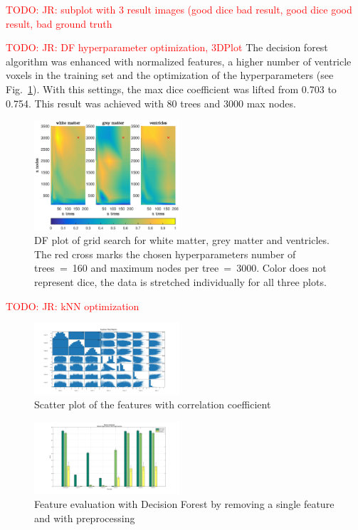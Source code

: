 \documentclass[journal]{IEEEtran}
\newcommand\TODO[1]{\textcolor{red}{TODO: #1}}
\begin{document}
\TODO{JR: subplot with 3 result images (good dice bad result, good dice good result, bad ground truth}



\TODO{JR: DF hyperparameter optimization, 3DPlot}
The decision forest algorithm was enhanced with normalized features, a higher number of ventricle voxels in the training set and the optimization of the hyperparameters (see Fig.~\ref{f.df_white}). With this settings, the max dice coefficient was lifted from 0.703 to 0.754. This result was achieved with 80 trees and 3000 max nodes.

\begin{figure}[h!]\label{f.df_white}
	\centering
	\includegraphics[width=0.48\textwidth]{images/df_grid}
	\caption{DF plot of grid search for white matter, grey matter and ventricles. The red cross marks the chosen hyperparameters number of trees~=~160 and maximum nodes per tree~=~3000. Color does not represent dice, the data is stretched individually for all three plots.}
\end{figure}

\TODO{JR: kNN optimization}

\begin{figure}\label{scatterplot}
	\centering
	\includegraphics[width=0.48\textwidth]{images/ScatterPlotMatrix}
	\caption{Scatter plot of the features with correlation coefficient}
\end{figure}

\begin{figure}\label{DF_FeatEval_WSF_PP}
	\centering
	\includegraphics[width=0.48\textwidth]{images/DF_FeatEval_WSF_PP}
	\caption{Feature evaluation with Decision Forest by removing a single feature and with preprocessing}
\end{figure}
\end{document}
